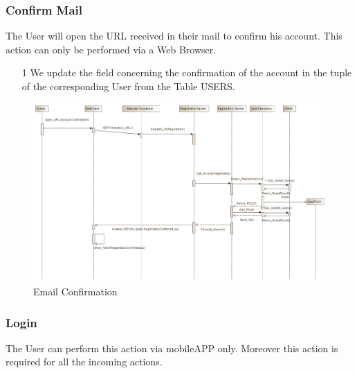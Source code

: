 \documentclass[12pt]{article}
\begin{document}
\subsubsection{Confirm Mail}
The User will open the URL received in their mail to confirm his account. This action can only be performed via a Web Browser.
\begin{enumerate}
	\item[1] We update the field concerning the confirmation of the account in the tuple of the corresponding User from the Table USERS.
\end{enumerate}
\begin{figure}[h]
	\centering
	\includegraphics[width=\textwidth]{../Images/Sequence_Final/Confirm_Email}
	\caption{Email Confirmation}
\end{figure}
\clearpage

\subsubsection{Login}
The User can perform this action via mobileAPP only. Moreover this action is required for all the incoming actions.
\end{document}
